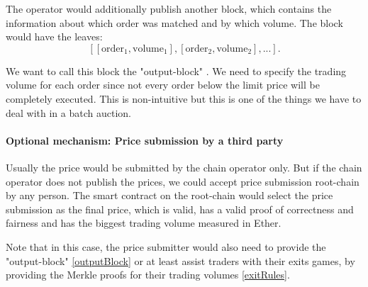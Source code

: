 \documentclass[11pt,parskip=full]{scrartcl}%
\begin{document}
The operator would additionally publish another block, which contains the information about which order was matched and by which volume.
The block would have the leaves:
\[[[\text{order}_1, \text{volume}_1], [\text{order}_2, \text{volume}_2],...].\]

We want to call this block the "output-block" \label{outputBlock}.
We need to specify the trading volume for each order since not every order below the limit price will be completely executed.
This is non-intuitive but this is one of the things we have to deal with in a batch auction.
\paragraph{Optional mechanism: Price submission by a third party}
Usually the price would be submitted by the chain operator only.
But if the chain operator does not publish the prices, we could accept price submission root-chain by any person.
The smart contract on the root-chain would select the price submission as the final price, which is valid, has a valid proof of correctness and fairness and has the biggest trading volume measured in Ether.

Note that in this case, the price submitter would also need to provide the "output-block" \ref{outputBlock} or at least assist traders with their exits games, by providing the Merkle proofs for their trading volumes \ref{exitRules}.
\end{document}
